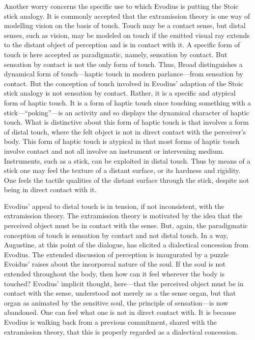 \documentclass[12pt]{article}
\begin{document}
Another worry concerns the specific use to which Evodius is putting the Stoic stick analogy. It is commonly accepted that the extramission theory is one way of modelling vision on the basis of touch. Touch may be a contact sense, but distal senses, such as vision, may be modeled on touch if the emitted visual ray extends to the distant object of perception and is in contact with it. A specific form of touch is here accepted as paradigmatic, namely, sensation by contact. But sensation by contact is not the only form of touch. Thus, Broad distinguishes a dynamical form of touch---haptic touch in modern parlance---from sensation by contact. But the conception of touch involved in Evodius' adaption of the Stoic stick analogy is not sensation by contact. Rather, it is a specific and atypical form of haptic touch. It is a form of haptic touch since touching something with a stick---``poking''---is an activity and so displays the dynamical character of haptic touch. What is distinctive about this form of haptic touch is that involves a form of distal touch, where the felt object is not in direct contact with the perceiver's body. This form of haptic touch is atypical in that most forms of haptic touch involve contact and not all involve an instrument or intervening medium. Instruments, such as a stick, can be exploited in distal touch. Thus by means of a stick one may feel the texture of a distant surface, or its hardness and rigidity. One feels the tactile qualities of the distant surface through the stick, despite not being in direct contact with it. 

Evodius' appeal to distal touch is in tension, if not inconsistent, with the extramission theory. The extramission theory is motivated by the idea that the perceived object must be in contact with the sense. But, again, the paradigmatic conception of touch is sensation by contact and not distal touch. In a way, Augustine, at this point of the dialogue, has elicited a dialectical concession from Evodius. The extended discussion of perception is inaugurated by a puzzle Evoidus' raises about the incorporeal nature of the soul. If the soul is not extended throughout the body, then how can it feel wherever the body is touched? Evodius' implicit thought, here---that the perceived object must be in contact with the sense, understood not merely as a the sense organ, but that organ as animated by the sensitive soul, the principle of sensation---is now abandoned. One can feel what one is not in direct contact with. It is because Evodius is walking back from a previous commitment, shared with the extramission theory, that this is properly regarded as a dialectical concession.
\end{document}

